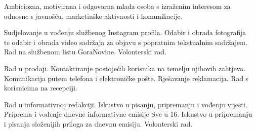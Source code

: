 \documentclass[10pt,a4paper]{altacv}
\begin{document}

\begin{fullwidth}
\makecvheader
\end{fullwidth}




Ambiciozna, motivirana i odgovorna mlada osoba s izraženim interesom za odnosne s javnošću, marketinške aktivnosti i komunikacije.


\nocite{*}
\item Sudjelovanje u vođenju službenog Instagram profila. Odabir i obrada fotografija te odabir i obrada video sadržaja za objavu s popratnim tekstualnim sadržajem. Rad na službenom listu GoraNovine. Volonterski rad.

\divider

\item Rad u prodaji. Kontaktiranje postojećih korisnika na temelju njihovih zahtjeva. Komunikacija putem telefona i elektroničke pošte. Rješavanje reklamacija. Rad s korisnicima na recepciji. 

\divider

\item Rad u informativnoj redakciji. Iskustvo u pisanju, pripremanju i vođenju vijesti. Priprema i vođenje dnevne informativne emisije Sve u 16. Iskustvo u pripremanju i pisanju složenijih priloga za dnevnu emisiju. Volonterski rad.
\end{document}
